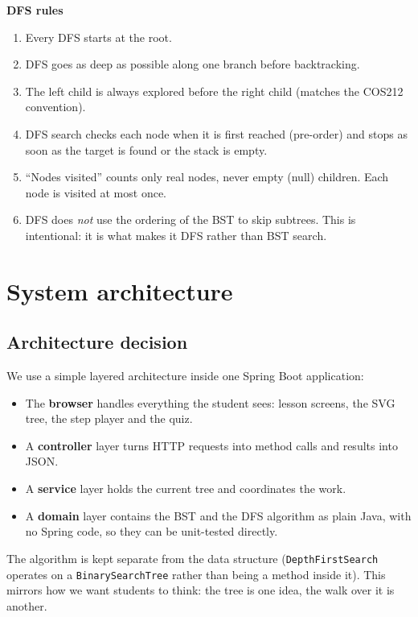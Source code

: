\documentclass[11pt,a4paper]{article}
\newcommand{\code}[1]{\texttt{#1}}
\begin{document}
\textbf{DFS rules}
\begin{enumerate}[label=BR-\arabic*, leftmargin=3.2em, start=6]
  \item Every DFS starts at the root.
  \item DFS goes as deep as possible along one branch before backtracking.
  \item The left child is always explored before the right child (matches the COS212 convention).
  \item DFS search checks each node when it is first reached (pre-order) and stops as soon as the
        target is found or the stack is empty.
  \item ``Nodes visited'' counts only real nodes, never empty (null) children. Each node is visited
        at most once.
  \item DFS does \emph{not} use the ordering of the BST to skip subtrees. This is intentional: it is
        what makes it DFS rather than BST search.
\end{enumerate}

\section{System architecture}

\subsection{Architecture decision}

We use a simple layered architecture inside one Spring Boot application:

\begin{itemize}
  \item The \textbf{browser} handles everything the student sees: lesson screens, the SVG tree, the
        step player and the quiz.
  \item A \textbf{controller} layer turns HTTP requests into method calls and results into JSON.
  \item A \textbf{service} layer holds the current tree and coordinates the work.
  \item A \textbf{domain} layer contains the BST and the DFS algorithm as plain Java, with no
        Spring code, so they can be unit-tested directly.
\end{itemize}

The algorithm is kept separate from the data structure (\code{DepthFirstSearch} operates on a
\code{BinarySearchTree} rather than being a method inside it). This mirrors how we want students to
think: the tree is one idea, the walk over it is another.
\end{document}
